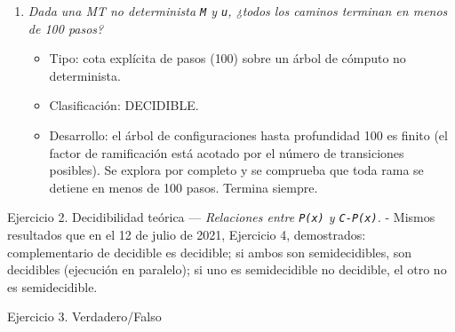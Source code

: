 \documentclass[12pt]{book} %
\providecommand{\tightlist}{%
  \setlength{\itemsep}{0pt}\setlength{\parskip}{0pt}}
\begin{document}
\begin{enumerate}
  \begin{itemize}
  \tightlist
  \item
    Tipo: propiedad asintótica del comportamiento.
  \item
    Clasificación: NO DECIDIBLE.
  \item
    Desarrollo: la complejidad en tiempo depende del comportamiento
    sobre infinitas entradas; es una propiedad no decidible (se reduce
    desde el problema de la parada: no se puede determinar en general la
    cota de pasos de una MT arbitraria).
  \end{itemize}
\item
  \emph{Dada una MT no determinista \texttt{M} y \texttt{u}, ¿todos los
  caminos terminan en menos de 100 pasos?}

  \begin{itemize}
  \tightlist
  \item
    Tipo: cota explícita de pasos (100) sobre un árbol de cómputo no
    determinista.
  \item
    Clasificación: DECIDIBLE.
  \item
    Desarrollo: el árbol de configuraciones hasta profundidad 100 es
    finito (el factor de ramificación está acotado por el número de
    transiciones posibles). Se explora por completo y se comprueba que
    toda rama se detiene en menos de 100 pasos. Termina siempre.
  \end{itemize}
\end{enumerate}

Ejercicio 2. Decidibilidad teórica --- \emph{Relaciones entre
\texttt{P(x)} y \texttt{C-P(x)}.} - Mismos resultados que en el 12 de
julio de 2021, Ejercicio 4, demostrados: complementario de decidible es
decidible; si ambos son semidecidibles, son decidibles (ejecución en
paralelo); si uno es semidecidible no decidible, el otro no es
semidecidible.

Ejercicio 3. Verdadero/Falso
\end{document}
